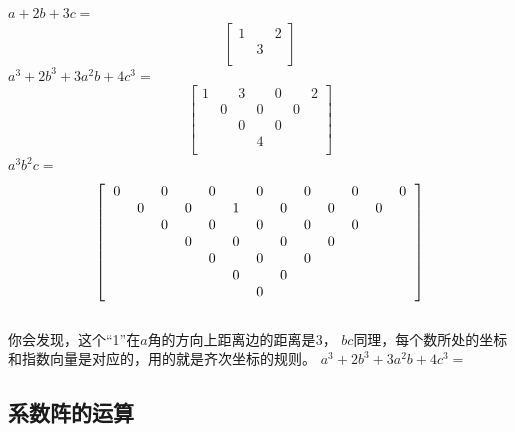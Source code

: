 \documentclass[UTF8]{ctexart}
\begin{document}
$ a+2b+3c= $
\renewcommand*{\arraystretch}{1.732}\[\left[\begin{matrix}
	1& &2 \\
	& 3& \\
\end{matrix}\right]\]
$ a^{3}+2b^{3}+3a^{2}b+4c^{3}= $
\renewcommand*{\arraystretch}{1.732}\[\left[\begin{matrix}
	1& & 3& & 0& &2 \\
	& 0& &0 & &0 & \\
	& & 0& &0 & & \\
	& & & 4& & & \\
\end{matrix}\right]\]
$ a^{3}b^{2}c= $
\renewcommand*{\arraystretch}{1.732}\[
\left[\begin{matrix}
	\begin{tabular}{ccccccccccccc}
		0& &0& &0& &0& &0& &0& &0\\
		&0& &0& &1& &0& &0& &0&\\
		& &0& &0& &0& &0& &0& &\\
		& & &0& &0& &0& &0& & &\\
		& & & &0& &0& &0& & & &\\
		& & & & &0& &0& & & & &\\
		& & & & & &0& & & & & &\\
	\end{tabular}
\end{matrix}\right]
\]\\
你会发现，这个“1”在$ a $角的方向上距离边的距离是$ 3 $，
$ bc $同理，每个数所处的坐标和指数向量是对应的，用的就是齐次坐标的规则。
$ a^{3}+2b^{3}+3a^{2}b+4c^{3}= $
\subsection{系数阵的运算}
\end{document}
